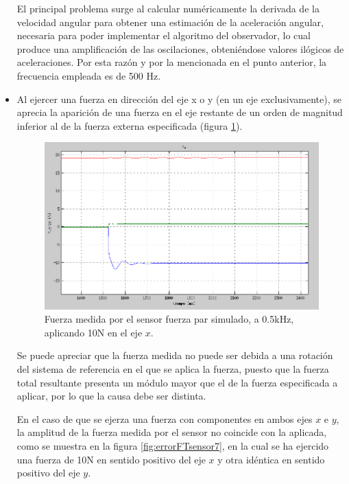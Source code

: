 \begin{itemize}
El principal problema surge al calcular numéricamente la derivada de la velocidad angular para obtener una estimación de la aceleración angular, necesaria para poder implementar el algoritmo del observador, lo cual produce una amplificación de las oscilaciones, obteniéndose valores ilógicos de aceleraciones. Por esta razón y por la mencionada en el punto anterior, la frecuencia empleada es de 500 Hz. \par 

\item Al ejercer una fuerza en dirección del eje x o y (en un eje exclusivamente), se aprecia la aparición de una fuerza en el eje restante de un orden de magnitud inferior al de la fuerza externa especificada (figura \ref{fig:errorFTsensor6}). \par 

\begin{figure}[h!]
\centering
\includegraphics[scale=0.45]{Figuras/FTerror6}
\caption{Fuerza medida por el sensor fuerza par simulado, a 0.5kHz, aplicando 10N en el eje $x$.}
\label{fig:errorFTsensor6}
\end{figure}

Se puede apreciar que la fuerza medida no puede ser debida a una rotación del sistema de referencia en el que se aplica la fuerza, puesto que la fuerza total resultante presenta un módulo mayor que el de la fuerza especificada a aplicar, por lo que la causa debe ser distinta. \par  

En el caso de que se ejerza una fuerza con componentes en ambos ejes $x$ e $y$, la amplitud de la fuerza medida por el sensor no coincide con la aplicada, como se muestra en la figura \ref{fig:errorFTsensor7}, en la cual se ha ejercido una fuerza de 10N en sentido positivo del eje $x$ y otra idéntica en sentido positivo del eje $y$. \par 


\end{itemize}
